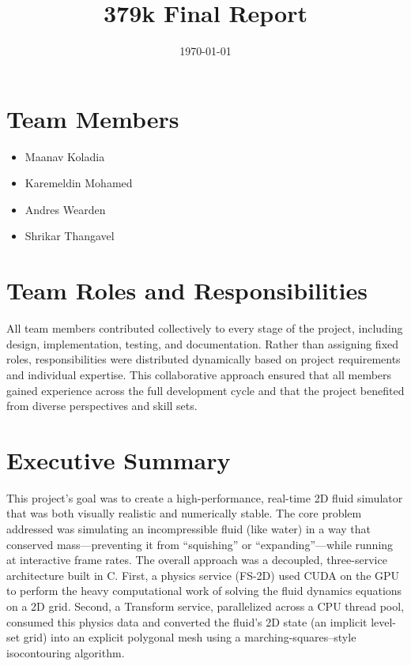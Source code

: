 \documentclass[12pt,a4paper]{article}
\title{\Huge\bfseries 379k Final Report}
\date{\today}
\begin{document}
\maketitle

\section{Team Members}

\begin{itemize}
    \item Maanav Koladia
    \item Karemeldin Mohamed
    \item Andres Wearden
    \item Shrikar Thangavel
\end{itemize}

\section{Team Roles and Responsibilities}
All team members contributed collectively to every stage of the project, including design, implementation, testing, and documentation. Rather than assigning fixed roles, responsibilities were distributed dynamically based on project requirements and individual expertise. This collaborative approach ensured that all members gained experience across the full development cycle and that the project benefited from diverse perspectives and skill sets.

\section{Executive Summary}

This project's goal was to create a high-performance, real-time 2D fluid simulator that was both visually realistic and numerically stable. The core problem addressed was simulating an incompressible fluid (like water) in a way that conserved mass—preventing it from “squishing” or “expanding”—while running at interactive frame rates. The overall approach was a decoupled, three-service architecture built in C. First, a physics service (FS-2D) used CUDA on the GPU to perform the heavy computational work of solving the fluid dynamics equations on a 2D grid. Second, a Transform service, parallelized across a CPU thread pool, consumed this physics data and converted the fluid’s 2D state (an implicit level-set grid) into an explicit polygonal mesh using a marching-squares–style isocontouring algorithm.
\end{document}
